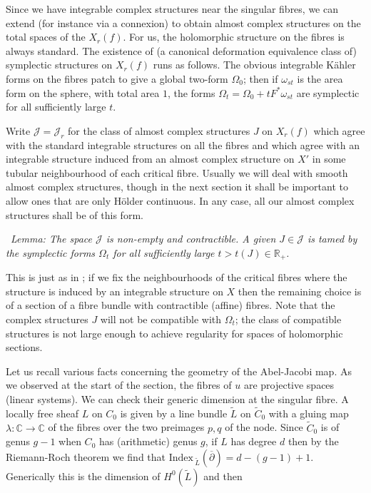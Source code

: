 \documentclass[10pt]{article}
\newcommand{\cc}{\mathbb{C}}
\newcommand{\rr}{\mathbb{R}}
\newcommand{\cdbar}{\overline{\partial}}
\newcommand{\ind}{\mathrm{Index \,}}
\newcounter{Universal}[section]
\renewcommand{\theUniversal}{\thesection.\arabic{Universal}}
\newenvironment{Italic}{\refstepcounter{Universal} \par \vspace{0.5cm}
\noindent {\bf (\theUniversal)}\ \it}{\par \vspace{0.5cm}}
\newenvironment{Lem}{\begin{Italic}{\sc Lemma: }}{\end{Italic}}
\begin{document}
\vspace{0.2cm}

\noindent Since we have integrable complex structures near the
singular fibres, we can extend (for instance via a connexion) to
obtain almost complex structures on the total spaces of the
$X_r(f)$. For us, the holomorphic structure on the fibres is always standard.
The existence of (a canonical deformation equivalence
class of) symplectic structures on $X_r(f)$ runs as follows.  The
obvious integrable K\"ahler forms on the fibres patch to give a
global two-form $\Omega_0$; then if $\omega_{st}$ is the area form on
the sphere, with total area $1$, the forms $\Omega_t = \Omega_0 + t
F^* \omega_{st}$ are symplectic for all sufficiently large $t$. 

\vspace{0.2cm}

\noindent Write $\mathcal{J} = \mathcal{J}_r$ for the class of almost
complex structures $J$ on $X_r(f)$ which agree 
with the standard integrable structures on all the fibres and which
agree with an 
integrable structure induced from an almost complex structure on $X'$
in some tubular neighbourhood of each critical fibre.
Usually we will deal with smooth almost complex structures, though in
the next section it shall be important to allow ones that are only
H\"older continuous.  In any case, all our almost complex structures
shall be of this form.

\begin{Lem} \label{connectedparameters}
The space $\mathcal{J}$ is non-empty and contractible. A given $J \in
\mathcal{J}$ is tamed by the symplectic forms $\Omega_t$ for all
sufficiently large $t > t(J) \in \rr_+$.
\end{Lem}

\noindent This is just as in \cite{SKDIS}; if we fix the
neighbourhoods of the critical fibres where the structure is induced
by an integrable structure on $X$ then the remaining choice is of a
section of a fibre bundle with contractible (affine) fibres.  Note
that the complex structures $J$ will not be compatible with
$\Omega_t$;  the class of compatible structures is not large enough to
achieve regularity for spaces of holomorphic sections.

\vspace{0.2cm}

\noindent Let us recall various facts
concerning the geometry of the Abel-Jacobi map.  As we observed at the
start of the section, the fibres of $u$ are projective spaces
(linear systems).  We can check their generic dimension at the
singular fibre.  A locally free sheaf
$L$ on $C_0$ is given by a line bundle $\tilde{L}$ on
$\tilde{C}_0$ with a
gluing map $\lambda: \cc \rightarrow \cc$ of the fibres over the two
preimages $p,q$ of the node.  Since $\tilde{C}_0$ is of genus $g-1$ when
$C_0$ has (arithmetic) genus $g$, if $L$ has degree $d$ then by the
Riemann-Roch theorem we find that $\ind_{\tilde{L}} (\cdbar) =
d-(g-1)+1$.  Generically this is the dimension of $H^0 (\tilde{L})$
and then 
\end{document}
